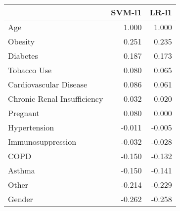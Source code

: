 \begin{tabular}{lrr}
\toprule
{} &  SVM-l1 &  LR-l1 \\
\midrule
Age                         &   1.000 &  1.000 \\
Obesity                     &   0.251 &  0.235 \\
Diabetes                    &   0.187 &  0.173 \\
Tobacco Use                 &   0.080 &  0.065 \\
Cardiovascular Disease      &   0.086 &  0.061 \\
Chronic Renal Insufficiency &   0.032 &  0.020 \\
Pregnant                    &   0.080 &  0.000 \\
Hypertension                &  -0.011 & -0.005 \\
Immunosuppression           &  -0.032 & -0.028 \\
COPD                        &  -0.150 & -0.132 \\
Asthma                      &  -0.150 & -0.141 \\
Other                       &  -0.214 & -0.229 \\
Gender                      &  -0.262 & -0.258 \\
\bottomrule
\end{tabular}
